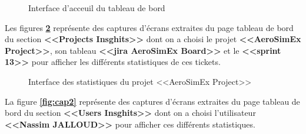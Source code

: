         \begin{figure}[H]

            \begin{minipage}{1\linewidth}
            \centering

            \caption{Interface d'acceuil du tableau de bord}
            \label{fig:cap0}
             \end{minipage}\hfill 
        \end{figure}
         \par Les figures \textbf{\ref{fig:cap1}} représente des captures d'écrans extraites du page tableau de bord du section \textbf{<<Projects Insghits>>} dont on a choisi le projet \textbf{<<AeroSimEx Project>>}, son tableau \textbf{<<jira AeroSimEx Board>>} et le \textbf{<<sprint 13>>} pour afficher les différents statistiques de ces tickets.

        \begin{figure}[H]

            \begin{minipage}{1\linewidth}
            \centering

            \caption{Interface des statistiques du projet <<AeroSimEx Project>>}
       \label{fig:cap1}
             \end{minipage}\hfill 
        \end{figure}
         \par La figure \textbf{\ref{fig:cap2}} représente des captures d'écrans extraites du page tableau de bord du section \textbf{<<Users Insghits>>} dont on a choisi l'utilisateur \textbf{<<Nassim JALLOUD>>} pour afficher ces différents statistiques.

